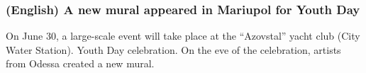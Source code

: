  
 
 
 
 

\subsubsection{(English) A new mural appeared in Mariupol for Youth Day}

On June 30, a large-scale event will take place at the \enquote{Azovstal} yacht
club (City Water Station).  Youth Day celebration. On the eve of the
celebration, artists from Odessa created a new mural.
